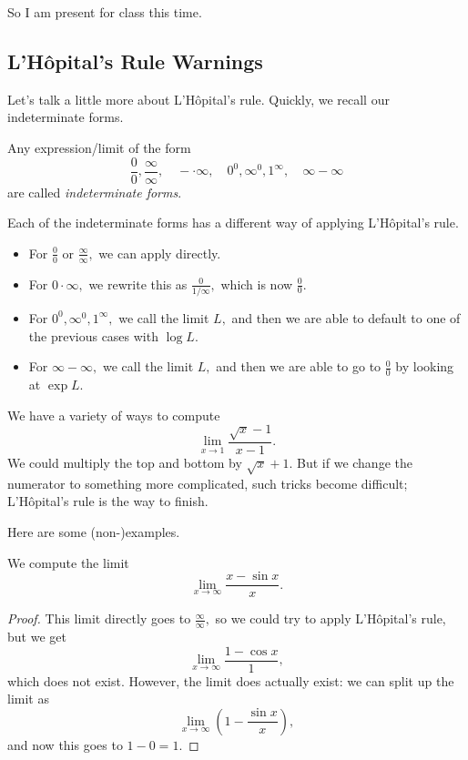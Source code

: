 \documentclass[../notes.tex]{subfiles}
\begin{document}


















So I am present for class this time.

\subsection{L'H\^opital's Rule Warnings}
Let's talk a little more about L'H\^{opital}'s rule. Quickly, we recall our indeterminate forms.
\begin{definition}
	Any expression/limit of the form
	\[\frac00,\frac\infty\infty,\quad-\cdot\infty,\quad0^0,\infty^0,1^\infty,\quad\infty-\infty\]
	are called \textit{indeterminate forms}.
\end{definition}
Each of the indeterminate forms has a different way of applying L'H\^opital's rule.
\begin{itemize}
	\item For $\frac00$ or $\frac\infty\infty,$ we can apply directly.
	\item For $0\cdot\infty,$ we rewrite this as $\frac0{1/\infty},$ which is now $\frac00.$
	\item For $0^0,\infty^0,1^\infty,$ we call the limit $L,$ and then we are able to default to one of the previous cases with $\log L.$
	\item For $\infty-\infty,$ we call the limit $L,$ and then we are able to go to $\frac00$ by looking at $\exp L.$
\end{itemize}
\begin{example}
	We have a variety of ways to compute
	\[\lim_{x\to1}\frac{\sqrt x-1}{x-1}.\]
	We could multiply the top and bottom by $\sqrt x+1.$ But if we change the numerator to something more complicated, such tricks become difficult; L'H\^opital's rule is the way to finish.
\end{example}
Here are some (non-)examples.
\begin{exercise}
	We compute the limit
	\[\lim_{x\to\infty}\frac{x-\sin x}x.\]
\end{exercise}
\begin{proof}
	This limit directly goes to $\frac\infty\infty,$ so we could try to apply L'H\^opital's rule, but we get
	\[\lim_{x\to\infty}\frac{1-\cos x}1,\]
	which does not exist. However, the limit does actually exist: we can split up the limit as
	\[\lim_{x\to\infty}\left(1-\frac{\sin x}x\right),\]
	and now this goes to $1-0=\boxed1.$
\end{proof}
\end{document}
